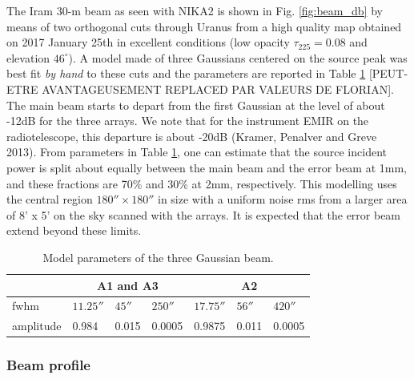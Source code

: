 The Iram 30-m beam as seen with NIKA2 is shown in
Fig. \ref{fig:beam_db} by means of two orthogonal cuts through Uranus
from a high quality map obtained on 2017 January 25th in excellent conditions
(low opacity $\tau_{225}=0.08$ and elevation $46^{\circ}$).
A model made of three Gaussians centered on the source peak was best
fit {\it by hand} to these cuts and the parameters are reported in
Table \ref{tab:3gauss} [PEUT-ETRE AVANTAGEUSEMENT REPLACED PAR VALEURS DE FLORIAN].
The main beam starts to depart from the first
Gaussian at the level of about -12dB for the three arrays.
We note that for the instrument EMIR on the radiotelescope,
this departure is about -20dB (Kramer, Penalver and Greve 2013).
From parameters in Table \ref{tab:3gauss}, one can estimate that
the source incident power is split about equally between the main beam
and the error beam at 1mm, and these fractions are 70\% and 30\% at 2mm, respectively.
This modelling uses the central
region   $180'' \times 180''$ in size with a uniform noise rms from
a larger area of 8' x 5' on the sky scanned with the arrays. It is expected
that the error beam extend beyond these limits.


\begin{table}
\centering 
\caption[]{Model parameters of the three Gaussian beam.}
\begin{tabular}{|l|l|l|l|l|l|l|}
\hline
               & \multicolumn{3}{c|}{A1 and A3} & \multicolumn{3}{c|}{A2}  \\
\hline
fwhm      & $11.25''$ & $45''$  & $250''$ & $17.75''$ & $56''$  & $420''$ \\
amplitude & 0.984     & 0.015   & 0.0005   &  0.9875   & 0.011   &  0.0005\\
\hline
\end{tabular}
\label{tab:3gauss}
\end{table}


\subsubsection{Beam profile}

